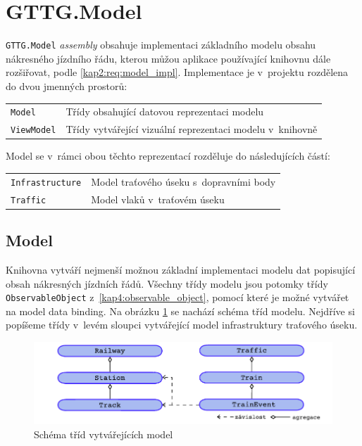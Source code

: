 \newpage
\section{GTTG.Model}
\label{kap4:model}
\texttt{GTTG.Model} \textit{assembly} obsahuje implementaci základního modelu obsahu nákresného jízdního řádu, kterou můžou aplikace používající knihovnu dále rozšiřovat, podle \ref{kap2:req:model_impl}. Implementace je v~projektu rozdělena do dvou jmenných prostorů:

\begin{tabular}{ m{} m{} }
\texttt{Model} & Třídy obsahující datovou reprezentaci modelu \\
\texttt{ViewModel} & Třídy vytvářející vizuální reprezentaci modelu v~knihovně \\ 
\end{tabular}
\newline
\newline
Model se v~rámci obou těchto reprezentací rozděluje do následujících částí:

\begin{tabular}{ m{} m{} }
\texttt{Infrastructure} & Model traťového úseku s~dopravními body \\
\texttt{Traffic} & Model vlaků v~traťovém úseku \\ 
\end{tabular}

\subsection{Model}
Knihovna vytváří nejmenší možnou základní implementaci modelu dat popisující obsah nákresných jízdních řádů. Všechny třídy modelu jsou potomky třídy \linebreak \texttt{ObservableObject} z~\ref{kap4:observable_object}, pomocí které je možné vytvářet na model data binding. 
Na obrázku \ref{fig:kap4:gttg-core-base-diagram} se nachází schéma tříd modelu. Nejdříve si popíšeme třídy v~levém sloupci vytvářející model infrastruktury traťového úseku.

\begin{figure}[!hbt]
	\includegraphics[width=\textwidth]{../img/kap4_gttg-core-model-diagram}
	\caption{Schéma tříd vytvářejících model}
	\label{fig:kap4:gttg-core-base-diagram}
\end{figure}

